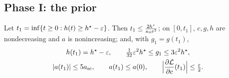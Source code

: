 \subsection{Phase I: the prior}

\begin{lemma}
\label{lem:J-prior}
Let $t_1=\inf\{t\ge0: h(t)\ge h^\star-\varepsilon\}$. Then $t_1\le\frac{2 h^\star}{\kappa_0\varepsilon^3}$; on $[0,t_1]$, $c,g, h$ are nondecreasing and $a$ is
nonincreasing; and, with $ g_1=g(t_1)$,
\begin{gather*}
  h(t_1)= h^\star-\initscale,\qquad \tfrac{1}{32}\initscale^2 h^\star\le g_1\le3\initscale^2 h^\star,\\
 |a(t_1)|\le5a_{\mathrm{sc}},\qquad a(t_1)\le a(0),\qquad \Bigl|\pd{\mathcal L}{c}(t_1)\Bigr|\le\tfrac{\initscale}{2} .
\end{gather*}
\end{lemma}

